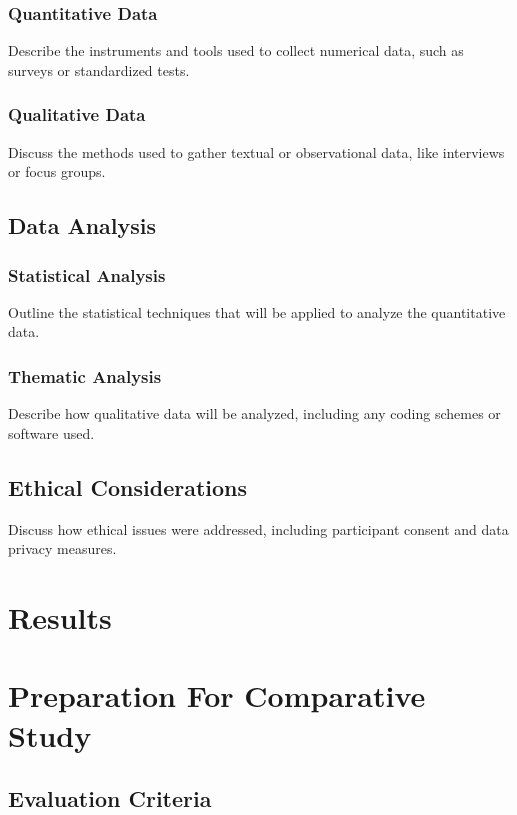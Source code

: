 \subsubsection{Quantitative Data}
Describe the instruments and tools used to collect numerical data, such as surveys or standardized tests.
\subsubsection{Qualitative Data}
Discuss the methods used to gather textual or observational data, like interviews or focus groups.

\subsection{Data Analysis}
\subsubsection{Statistical Analysis}
Outline the statistical techniques that will be applied to analyze the quantitative data.
\subsubsection{Thematic Analysis}
Describe how qualitative data will be analyzed, including any coding schemes or software used.

\subsection{Ethical Considerations}
Discuss how ethical issues were addressed, including participant consent and data privacy measures.

\section{Results} %
\lipsum[1] %




\section{Preparation For Comparative Study}
\label{ComparativeStudy}

\subsection{Evaluation Criteria }
\label{Data preparation}    

